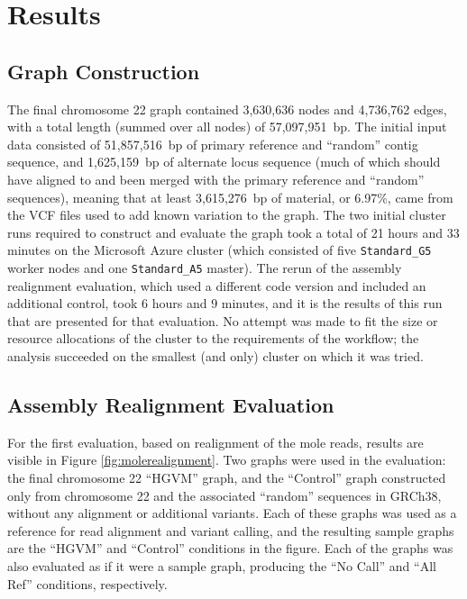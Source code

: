 \section{Results}

\subsection{Graph Construction}

The final chromosome 22 graph contained 3,630,636 nodes and 4,736,762 edges, with a total length (summed over all nodes) of 57,097,951~bp. The initial input data consisted of 51,857,516~bp of primary reference and ``random'' contig sequence, and 1,625,159~bp of alternate locus sequence (much of which should have aligned to and been merged with the primary reference and ``random'' sequences), meaning that at least 3,615,276~bp of material, or 6.97\%, came from the VCF files used to add known variation to the graph. %
The two initial cluster runs required to construct and evaluate the graph took a total of 21 hours and 33 minutes on the Microsoft Azure cluster (which consisted of five \texttt{Standard\_G5} worker nodes and one \texttt{Standard\_A5} master). The rerun of the assembly realignment evaluation, which used a different code version and included an additional control, took 6 hours and 9 minutes, and it is the results of this run that are presented for that evaluation. No attempt was made to fit the size or resource allocations of the cluster to the requirements of the workflow; the analysis succeeded on the smallest (and only) cluster on which it was tried.

\subsection{Assembly Realignment Evaluation}

For the first evaluation, based on realignment of the mole reads, results are visible in Figure \ref{fig:molerealignment}. Two graphs were used in the evaluation: the final chromosome 22 ``HGVM'' graph, and the ``Control'' graph constructed only from chromosome 22 and the associated ``random'' sequences in GRCh38, without any alignment or additional variants. Each of these graphs was used as a reference for read alignment and variant calling, and the resulting sample graphs are the ``HGVM'' and ``Control'' conditions in the figure. Each of the graphs was also evaluated as if it were a sample graph, producing the ``No Call'' and ``All Ref'' conditions, respectively.

